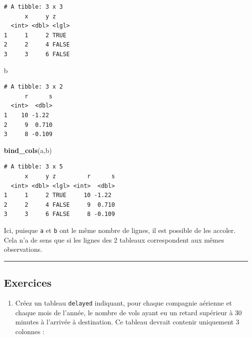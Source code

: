 \documentclass[a4paperpaper,]{article}
\newenvironment{Shaded}{\begin{snugshade}}{\end{snugshade}}
\newcommand{\KeywordTok}[1]{\textcolor[rgb]{0.13,0.29,0.53}{\textbf{#1}}}
\newcommand{\NormalTok}[1]{#1}
\providecommand{\tightlist}{%
  \setlength{\itemsep}{0pt}\setlength{\parskip}{0pt}}
\theoremstyle{definition}
\theoremstyle{definition}
\theoremstyle{definition}
\theoremstyle{remark}
\begin{document}
\begin{verbatim}
# A tibble: 3 x 3
      x     y z    
  <int> <dbl> <lgl>
1     1     2 TRUE 
2     2     4 FALSE
3     3     6 FALSE
\end{verbatim}

\begin{Shaded}
\begin{Highlighting}[]
\NormalTok{b}
\end{Highlighting}
\end{Shaded}

\begin{verbatim}
# A tibble: 3 x 2
      r      s
  <int>  <dbl>
1    10 -1.22 
2     9  0.710
3     8 -0.109
\end{verbatim}

\begin{Shaded}
\begin{Highlighting}[]
\KeywordTok{bind_cols}\NormalTok{(a,b)}
\end{Highlighting}
\end{Shaded}

\begin{verbatim}
# A tibble: 3 x 5
      x     y z         r      s
  <int> <dbl> <lgl> <int>  <dbl>
1     1     2 TRUE     10 -1.22 
2     2     4 FALSE     9  0.710
3     3     6 FALSE     8 -0.109
\end{verbatim}

Ici, puisque \texttt{a} et \texttt{b} ont le même nombre de lignes, il
est possible de les accoler. Cela n'a de sens que si les lignes des 2
tableaux correspondent aux mêmes observations.

\begin{center}\rule{0.5\linewidth}{\linethickness}\end{center}

\subsection{Exercices}\label{exercices-11}

\begin{enumerate}
\def\labelenumi{\arabic{enumi}.}
\tightlist
\item
  Créez un tableau \texttt{delayed} indiquant, pour chaque compagnie
  aérienne et chaque mois de l'année, le nombre de vols ayant eu un
  retard supérieur à 30 minutes à l'arrivée à destination. Ce tableau
  devrait contenir uniquement 3 colonnes :
\end{enumerate}
\end{document}
